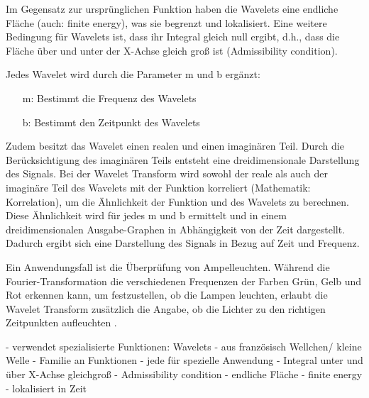 Im Gegensatz zur ursprünglichen Funktion haben die Wavelets eine endliche Fläche (auch: finite energy), was sie begrenzt und lokalisiert. Eine weitere Bedingung für Wavelets ist, dass ihr Integral gleich null ergibt, d.h., dass die Fläche über und unter der X-Achse gleich groß ist (Admissibility condition). 

\par

Jedes Wavelet wird durch die Parameter m und b ergänzt:

%
\begin{itemize}
    \item[m:] Bestimmt die Frequenz des Wavelets
    \item[b:] Bestimmt den Zeitpunkt des Wavelets
\end{itemize}
%

Zudem besitzt das Wavelet einen realen und einen imaginären Teil. Durch die Berücksichtigung des imaginären Teils entsteht eine dreidimensionale Darstellung des Signals. Bei der Wavelet Transform wird sowohl der reale als auch der imaginäre Teil des Wavelets mit der Funktion korreliert (Mathematik: Korrelation), um die Ähnlichkeit der Funktion und des Wavelets zu berechnen. Diese Ähnlichkeit wird für jedes m und b ermittelt und in einem dreidimensionalen Ausgabe-Graphen in Abhängigkeit von der Zeit dargestellt. Dadurch ergibt sich eine Darstellung des Signals in Bezug auf Zeit und Frequenz.

\par

Ein Anwendungsfall ist die Überprüfung von Ampelleuchten. Während die Fourier-Transformation die verschiedenen Frequenzen der Farben Grün, Gelb und Rot erkennen kann, um festzustellen, ob die Lampen leuchten, erlaubt die Wavelet Transform zusätzlich die Angabe, ob die Lichter zu den richtigen Zeitpunkten aufleuchten \parencite{wavelets}.

%
 - verwendet spezialisierte Funktionen: Wavelets
 - aus französisch Wellchen/ kleine Welle
 - Familie an Funktionen
   - jede für spezielle Anwendung
 - Integral unter und über X-Achse gleichgroß
   - Admissibility condition
 - endliche Fläche
   - finite energy
   - lokalisiert in Zeit
